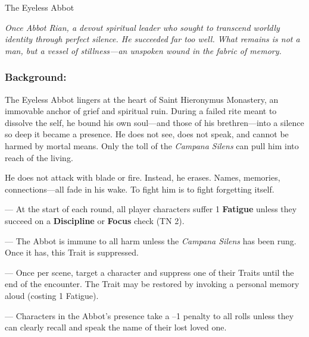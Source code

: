\documentclass[nodeprecatedcode,bg=print]{dndbook/dndbook}
\begin{document}
\begin{WyrdFullNPC}[%
    name=The Eyeless Abbot,%
    description=Silence Incarnate,%
    float=!t%
  ]{The Eyeless Abbot}
  
  \emph{Once Abbot Rian, a devout spiritual leader who sought to transcend worldly identity through perfect silence. He succeeded far too well. What remains is not a man, but a vessel of stillness—an unspoken wound in the fabric of memory.}
  
  \subsubsection*{Background:}
  The Eyeless Abbot lingers at the heart of Saint Hieronymus Monastery, an immovable anchor of grief and spiritual ruin. During a failed rite meant to dissolve the self, he bound his own soul—and those of his brethren—into a silence so deep it became a presence. He does not see, does not speak, and cannot be harmed by mortal means. Only the toll of the \emph{Campana Silens} can pull him into reach of the living.
  
  He does not attack with blade or fire. Instead, he erases. Names, memories, connections—all fade in his wake. To fight him is to fight forgetting itself.
  
  \vspace{0.5\baselineskip}
  \SkillsBox[%
    expert={Will},%
    skilled={Focus, Discipline},%
    novice={Presence, Awareness, Insight}%
  ]
  
  \begin{TraitsBox}
    \item[Silence Hungers] — At the start of each round, all player characters suffer 1 \textbf{Fatigue} unless they succeed on a \textbf{Discipline} or \textbf{Focus} check (TN 2).
    \item[Untouchable Form] — The Abbot is immune to all harm unless the \emph{Campana Silens} has been rung. Once it has, this Trait is suppressed.
    \item[Erase the Self] — Once per scene, target a character and suppress one of their Traits until the end of the encounter. The Trait may be restored by invoking a personal memory aloud (costing 1 Fatigue).
    \item[Aura of Dread] — Characters in the Abbot’s presence take a –1 penalty to all rolls unless they can clearly recall and speak the name of their lost loved one.
  \end{TraitsBox}

  \DamageBox
\end{WyrdFullNPC}
\end{document}
